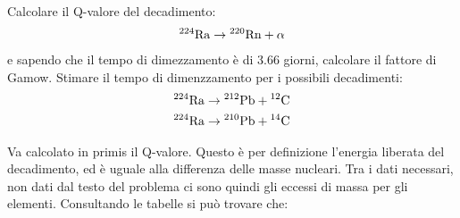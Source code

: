 \documentclass[../main.tex]{subfiles}
\begin{document}
		\begin{ese}[4.1]
			Calcolare il Q-valore del decadimento:
			\begin{gather}
			\mathrm{^{224}Ra}\to\mathrm{^{220}Rn}+\alpha 
			\end{gather}
			e sapendo che il tempo di dimezzamento è di 3.66 giorni, calcolare il fattore di Gamow.
			Stimare il tempo di dimenzzamento per i possibili decadimenti:
			\begin{gather}
			\mathrm{^{224}Ra}\to\mathrm{^{212}Pb}+\mathrm{^{12}C} \\
			 \mathrm{^{224}Ra}\to\mathrm{^{210}Pb}+\mathrm{^{14}C}
			 \end{gather} 
		\end{ese}
		\begin{svol}
			Va calcolato in primis il Q-valore. Questo è per definizione l'energia liberata del decadimento, ed è uguale alla differenza delle masse nucleari. Tra i dati necessari, non dati dal testo del problema ci sono quindi gli eccessi di massa per gli elementi. Consultando le tabelle si può trovare che:
			

\end{svol}
\end{document}
